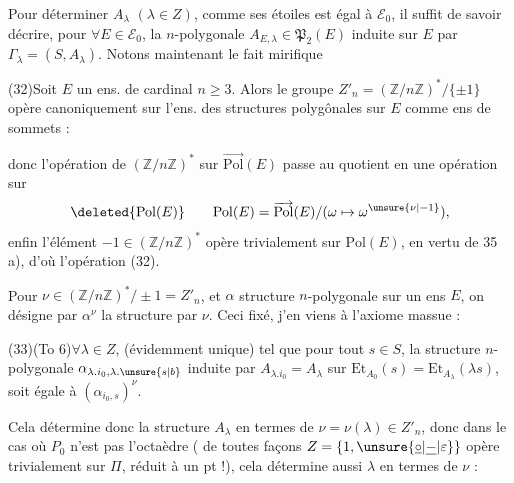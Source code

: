 Pour déterminer   $A_\lambda$ $(\lambda\in Z)$, comme  ses étoiles est égal à $\mathcal E_0$, il suffit de savoir décrire,  pour $\forall E\in\mathcal E_0$, la  $n$-polygonale $A_{E,\lambda}\in\mathfrak P_2(E)$ induite sur $E$ par $\Gamma_\lambda=(S,A_\lambda)$. Notons maintenant le fait mirifique

(32)\qquad Soit $E$ un ens.  de cardinal $n\geqslant3$. Alors le groupe $Z'_n=(\mathbb Z/n\mathbb Z)^*/\{\pm1\}$ opère canoniquement sur l'ens.  des structures polygônales sur $E$ comme ens de sommets :



donc l'opération de $(\mathbb Z/n\mathbb Z)^*$ sur $\overrightarrow{\mathrm{Pol}}(E)$ passe au quotient en une opération sur
\[
\deleted{\mathrm{Pol}(E)}\qquad\mathrm{Pol}(E)=\overrightarrow{\mathrm{Pol}}(E)/(\omega\mapsto\omega^{\unsure{\nu|-1}}),
\]
enfin l'élément $-1\in(\mathbb Z/n\mathbb Z)^*$ opère trivialement sur $\mathrm{Pol}(E)$, en vertu de 35 a), d'où l'opération (32).

Pour $\nu\in(\mathbb Z/n\mathbb Z)^*/\pm1=Z'_n$, et $\alpha$ structure $n$-polygonale sur un ens $E$, on désigne par $\alpha^\nu$ la structure  par $\nu$. Ceci fixé, j'en viens à l'axiome massue :


(33)\qquad (To 6)\qquad $\forall\lambda\in Z$,   (évidemment unique) tel que pour tout $s\in S$, la structure $n$-polygonale  $\alpha_{\lambda.i_0,\lambda.\unsure{s|b}}$ induite par $A_{\lambda.i_0}=A_\lambda$ sur $\mathrm{Et}_{A_0}(s)=\mathrm{Et}_{A_\lambda}(\lambda s)$, soit égale à $(\alpha_{i_0,s})^\nu$.

Cela détermine donc la structure $A_\lambda$ en termes de $\nu=\nu(\lambda)\in Z'_n$,  donc dans le cas où $P_0$ n'est pas l'octaèdre ( de toutes façons $Z=\{1,\unsure{\underline{\circ}|\underline{-}|\varepsilon}\}$ opère trivialement sur $\Pi$, réduit à un pt !), cela détermine aussi $\lambda$ en termes de $\nu$ :

